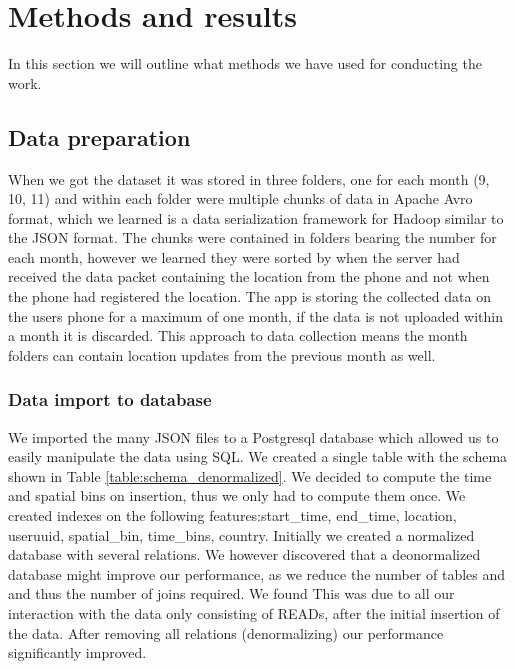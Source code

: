 \chapter{Methods and results}
\label{chap:methods_and_results}
In this section we will outline what methods we have used for conducting the work.
\section{Data preparation}

When we got the dataset it was stored in three folders, one for each month (9, 10, 11) and within each folder were multiple chunks of data in Apache Avro format\cite{apacheavro}, which we learned is a data serialization framework for Hadoop similar to the JSON format. The chunks were contained in folders bearing the number for each month, however we learned they were sorted by when the server had received the data packet containing the location from the phone and not when the phone had registered the location. The app is storing the collected data on the users phone for a maximum of one month, if the data is not uploaded within a month it is discarded. This approach to data collection means the month folders can contain location updates from the previous month as well.


\subsection{Data import to database}
We imported the many JSON files to a Postgresql database which allowed us to easily manipulate the data using SQL. We created a single table with the schema shown in Table \ref{table:schema_denormalized}. We decided to compute the time and spatial bins on insertion, thus we only had to compute them once. We created indexes on the following features:start\_time, end\_time, location, useruuid, spatial\_bin, time\_bins, country.
Initially we created a normalized database with several relations. We however discovered that a deonormalized database might improve our performance, as we reduce the number of tables and and thus the number of joins required\cite{sanders2001denormalization}. We found This was due to all our interaction with the data only consisting of READs, after the initial insertion of the data. After removing all relations (denormalizing) our performance significantly improved.

